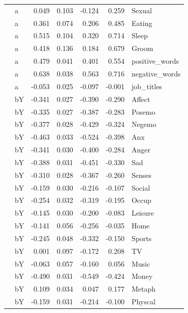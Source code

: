 \documentclass[11pt,a4paper]{article}
\begin{document}
\begin{longtable}{llrrrrl}
   & a &  0.049 &  0.103 &   -0.124 &     0.259 &          Sexual \\
   & a &  0.361 &  0.074 &    0.206 &     0.485 &          Eating \\
   & a &  0.515 &  0.104 &    0.320 &     0.714 &           Sleep \\
   & a &  0.418 &  0.136 &    0.184 &     0.679 &           Groom \\
   & a &  0.479 &  0.041 &    0.401 &     0.554 &  positive\_words \\
   & a &  0.638 &  0.038 &    0.563 &     0.716 &  negative\_words \\
   & a & -0.053 &  0.025 &   -0.097 &    -0.001 &      job\_titles \\
   & bY & -0.341 &  0.027 &   -0.390 &    -0.290 &          Affect \\
   & bY & -0.335 &  0.027 &   -0.387 &    -0.283 &          Posemo \\
   & bY & -0.377 &  0.028 &   -0.429 &    -0.324 &          Negemo \\
   & bY & -0.463 &  0.033 &   -0.524 &    -0.398 &             Anx \\
   & bY & -0.341 &  0.030 &   -0.400 &    -0.284 &           Anger \\
   & bY & -0.388 &  0.031 &   -0.451 &    -0.330 &             Sad \\
   & bY & -0.310 &  0.028 &   -0.367 &    -0.260 &          Senses \\
   & bY & -0.159 &  0.030 &   -0.216 &    -0.107 &          Social \\
   & bY & -0.254 &  0.032 &   -0.319 &    -0.195 &           Occup \\
   & bY & -0.145 &  0.030 &   -0.200 &    -0.083 &         Leisure \\
   & bY & -0.141 &  0.056 &   -0.256 &    -0.035 &            Home \\
   & bY & -0.245 &  0.048 &   -0.332 &    -0.150 &          Sports \\
   & bY &  0.001 &  0.097 &   -0.172 &     0.208 &              TV \\
   & bY & -0.063 &  0.057 &   -0.160 &     0.056 &           Music \\
   & bY & -0.490 &  0.031 &   -0.549 &    -0.424 &           Money \\
   & bY &  0.109 &  0.034 &    0.047 &     0.177 &          Metaph \\
   & bY & -0.159 &  0.031 &   -0.214 &    -0.100 &         Physcal \\

\end{longtable}
\end{document}
